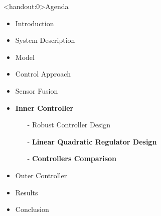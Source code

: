 
\begin{frame}<handout:0>{Agenda}{}
    \begin{itemize}
        \item Introduction
        \item System Description
        \item Model
        \item Control Approach
        \item Sensor Fusion
        \item \textcolor{aaublue}{\textbf{Inner Controller}}
        \begin{itemize}
            \item[-] Robust Controller Design
            \item[-] \textcolor{aaublue}{\textbf{Linear Quadratic Regulator Design}}
            \item[-] \textcolor{aaublue}{\textbf{Controllers Comparison}}
        \end{itemize}
        \item Outer Controller
        \item Results
        \item Conclusion
    \end{itemize}
\end{frame}